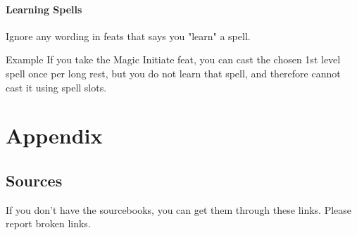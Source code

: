 \documentclass[letterpaper,twocolumn,openany,nodeprecatedcode]{dndbook}
\begin{document}
\subsubsection{Learning Spells}
Ignore any wording in feats that says you "learn" a spell.

\begin{DndComment}{Example}
If you take the Magic Initiate feat, you can cast the chosen 1st level spell once per long rest, but you do not learn that spell, and therefore cannot cast it using spell slots.
\end{DndComment}











\chapter{Appendix}

\section{Sources}
\label{sources}
If you don't have the sourcebooks, you can get them through these links. Please report broken links.
\end{document}
